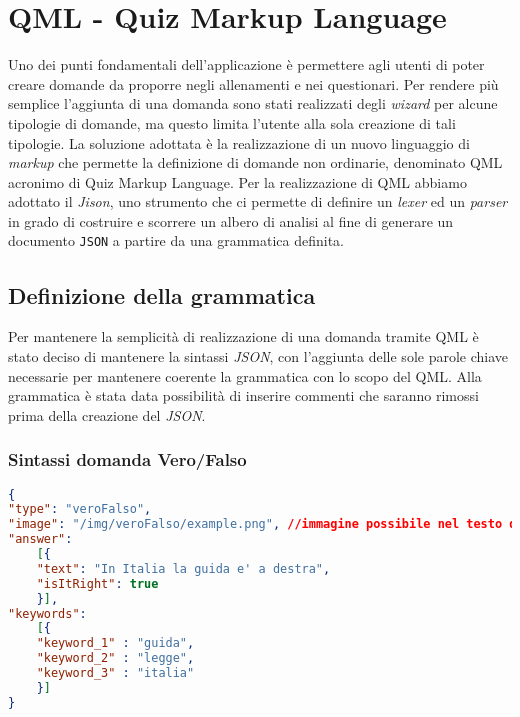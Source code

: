 \newpage
\section{QML - Quiz Markup Language}
Uno dei punti fondamentali dell'applicazione è permettere agli utenti di poter creare domande da proporre negli allenamenti e nei questionari. Per rendere più semplice l'aggiunta di una domanda sono stati realizzati degli \textit{wizard} per alcune tipologie di domande, ma questo limita l'utente alla sola creazione di tali tipologie. La soluzione adottata è la realizzazione di un nuovo linguaggio di \textit{markup} che permette la definizione di domande non ordinarie, denominato QML acronimo di Quiz Markup Language.
Per la realizzazione di QML abbiamo adottato il \textit{Jison}, uno strumento che ci permette di definire un \textit{lexer} ed un \textit{parser} in grado di costruire e scorrere un albero di analisi al fine di generare un documento \texttt{JSON} a partire da una grammatica definita.

\subsection{Definizione della grammatica}
Per mantenere la semplicità di realizzazione di una domanda tramite QML è stato deciso di mantenere la sintassi \textit{JSON}, con l'aggiunta delle sole parole chiave necessarie per mantenere coerente la grammatica con lo scopo del QML. Alla grammatica è stata data possibilità di inserire commenti che saranno rimossi prima della creazione del \textit{JSON}.

\subsubsection{Sintassi domanda Vero/Falso}
\begin{lstlisting}[language=json,firstnumber=1]
{	
"type": "veroFalso",
"image": "/img/veroFalso/example.png", //immagine possibile nel testo della domanda vero e falso
"answer":
	[{
	"text": "In Italia la guida e' a destra",
	"isItRight": true
	}],
"keywords":
	[{
	"keyword_1" : "guida",
	"keyword_2" : "legge",
	"keyword_3" : "italia"
	}] 
}
\end{lstlisting}

